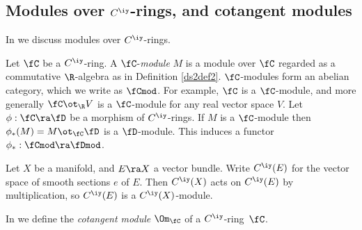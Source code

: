 \documentclass{article}
\begin{document}
\subsection{Modules over $C^\iy$-rings, and cotangent modules}
\label{ds23}

In \cite[\S 5]{Joyc4} we discuss modules over $C^\iy$-rings.

\begin{dfn} Let $\fC$ be a $C^\iy$-ring. A $\fC$-{\it module} $M$
is a module over $\fC$ regarded as a commutative $\R$-algebra as in
Definition \ref{ds2def2}. $\fC$-modules form an abelian
category, which we write as $\fCmod$. For
example, $\fC$ is a $\fC$-module, and more generally $\fC\ot_\R V$
is a $\fC$-module for any real vector space $V$. Let
$\phi:\fC\ra\fD$ be a morphism of $C^\iy$-rings. If $M$ is a
$\fC$-module then $\phi_*(M)=M\ot_\fC\fD$ is a $\fD$-module. This
induces a functor~$\phi_*:\fCmod\ra\fDmod$.
\label{ds2def5}
\end{dfn}

\begin{ex} Let $X$ be a manifold, and $E\ra X$  a vector bundle.
Write $C^\iy(E)$ for the vector space of smooth sections $e$ of $E$.
Then $C^\iy(X)$ acts on $C^\iy(E)$ by multiplication, so $C^\iy(E)$
is a $C^\iy(X)$-module.
\label{ds2ex3}
\end{ex}

In \cite[\S 5.3]{Joyc4} we define the {\it cotangent module\/}
$\Om_\fC$ of a $C^\iy$-ring~$\fC$.
\end{document}
